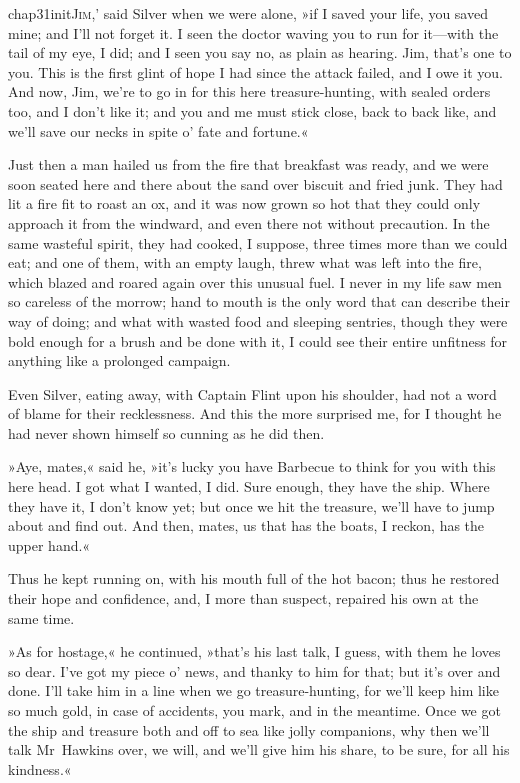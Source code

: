 
\lettrine[ante=`,lines=5,image=true,findent=2pt]{chap31initJ}{im},' said Silver when we were alone, »if I saved your life, you saved mine; and I'll not forget it. I seen the doctor waving you to run for it—with the tail of my eye, I did; and I seen you say no, as plain as hearing. Jim, that's one to you. This is the first glint of hope I had since the attack failed, and I owe it you. And now, Jim, we're to go in for this here treasure-hunting, with sealed orders too, and I don't like it; and you and me must stick close, back to back like, and we'll save our necks in spite o' fate and fortune.«

Just then a man hailed us from the fire that breakfast was ready, and we were soon seated here and there about the sand over biscuit and fried junk. They had lit a fire fit to roast an ox, and it was now grown so hot that they could only approach it from the windward, and even there not without precaution. In the same wasteful spirit, they had cooked, I suppose, three times more than we could eat; and one of them, with an empty laugh, threw what was left into the fire, which blazed and roared again over this unusual fuel. I never in my life saw men so careless of the morrow; hand to mouth is the only word that can describe their way of doing; and what with wasted food and sleeping sentries, though they were bold enough for a brush and be done with it, I could see their entire unfitness for anything like a prolonged campaign.

Even Silver, eating away, with Captain Flint upon his shoulder, had not a word of blame for their recklessness. And this the more surprised me, for I thought he had never shown himself so cunning as he did then.

»Aye, mates,« said he, »it's lucky you have Barbecue to think for you with this here head. I got what I wanted, I did. Sure enough, they have the ship. Where they have it, I don't know yet; but once we hit the treasure, we'll have to jump about and find out. And then, mates, us that has the boats, I reckon, has the upper hand.«

Thus he kept running on, with his mouth full of the hot bacon; thus he restored their hope and confidence, and, I more than suspect, repaired his own at the same time.

»As for hostage,« he continued, »that's his last talk, I guess, with them he loves so dear. I've got my piece o' news, and thanky to him for that; but it's over and done. I'll take him in a line when we go treasure-hunting, for we'll keep him like so much gold, in case of accidents, you mark, and in the meantime. Once we got the ship and treasure both and off to sea like jolly companions, why then we'll talk Mr~Hawkins over, we will, and we'll give him his share, to be sure, for all his kindness.«

